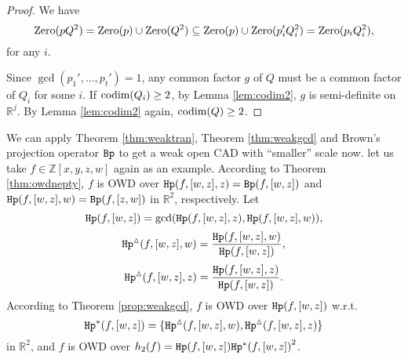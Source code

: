 \documentclass[amsthm]{elsart}
\def \codim {{\rm codim}}
\def \Bproj  {{\tt Bp}}
\def  \zero {{\rm Zero}}
\def  \Hproj {{\tt Hp}}
\def \RR {{\mathbb R}}
\def \ZZ {{\mathbb Z}}
\newcommand{\va}{\bm{\alpha}}
\begin{document}
\begin{proof}
We have
$$\zero(pQ^2)=\zero(p)\cup\zero(Q^2)\subseteq\zero(p)\cup\zero(p_i'Q_i^2)=\zero(p_iQ_i^2),$$
for any $i$.

Since $\gcd(p_1',\ldots,p_t')=1$, any common factor $g$ of $Q$ must be a common factor of $Q_i$ for some $i$. If $\codim(Q_i)\ge2$, by Lemma \ref{lem:codim2}, $g$ is semi-definite on $\RR^j$. By Lemma \ref{lem:codim2} again, $\codim(Q)\ge2$.
\end{proof}
\begin{comment}

 and $f$ is OWD over $p$ over
Let $$

Let $S^[i]\subseteq\RR^j$ be any maximal open connected set defined by $p_i\neq0$, $U\subseteq\RR^n$ be any open connected set defined by $f\neq0$. Let $S_1=\{\va|\va\in S,(\va\times\RR^{n-j})\cap U\neq\emptyset\}$, $S_2=\{\va|\va\in S,(\va\times\RR^{n-j})\cap U=\emptyset\}$. It is clear that $S=S_1\cup S_2$, $S_1\cap S_2=\emptyset$.

By proposition \ref{prop:weakgcd}, $f$ is OWD over $\sum_{i=1}^t (p_iQ_i^2)^2=p^2\sum_{i=1}^t(p_i'Q_i^2)^2$ since $f$ is OWD over $p_iQ_i^2$. This is equivalent to say that $f$ is OWD over $p$ w.r.t. $Q'=\{p_i'Q_i^2|i=1,\ldots,t\}$. Since $\zero(Q')=\zero(\bigcup_{i=1}^t p_i'Q_i)=\zero(Q)$, $f$ is OWD over $p$ w.r.t. $Q$.

Since $\gcd(p_1',\ldots,p_t')=1$, any common factor $g$ of $Q$ must be a common factor of $Q_i$ for some $i$, by Lemma \ref{lem:codim2}, $g$ is semi-definite on $\RR^j$, and $\codim(Q)\ge2$.

We have
$$\zero(pQ^2)=\zero(p)\cup\zero(Q^2)\subseteq\zero(p)\cup\zero(p_i'Q_i^2)=\zero(p_iQ_i^2),$$
for any $i$.\bigtriangleup
\end{comment}
We can apply Theorem \ref{thm:weaktran}, Theorem \ref{thm:weakgcd} and Brown's projection operator $\Bproj$ to get a weak open CAD with ``smaller'' scale now. let us take $f\in\ZZ[x,y,z,w]$ again as an example.
According to Theorem \ref{thm:owdnepty}, $f$ is OWD over $\Hproj(f,[w,z],z)=\Bproj(f,[w,z])$ and $\Hproj(f,[w,z],w)=\Bproj(f,[z,w])$ in $\RR^2$, respectively. Let $$\Hproj(f,[w,z])=\gcd(\Hproj(f,[w,z],z),\Hproj(f,[w,z],w)),$$ $${\Hproj^{\vartriangle}(f,[w,z],w)}=\frac{\Hproj(f,[w,z],w)}{\Hproj(f,[w,z])},$$ $${\Hproj^{\vartriangle}(f,[w,z],z)}=\frac{\Hproj(f,[w,z],z)}{\Hproj(f,[w,z])}.$$
According to Theorem \ref{prop:weakgcd}, $f$ is OWD over $\Hproj(f,[w,z])$ w.r.t. $${\Hproj^{\ast}(f,[w,z])}=\{{\Hproj^{\vartriangle}(f,[w,z],w)},{\Hproj^{\vartriangle}(f,[w,z],z)}\}$$
in $\RR^2$, and $f$ is OWD over $h_2(f)=\Hproj(f,[w,z]){\Hproj^{\ast}(f,[w,z])}^2$.
\end{document}
